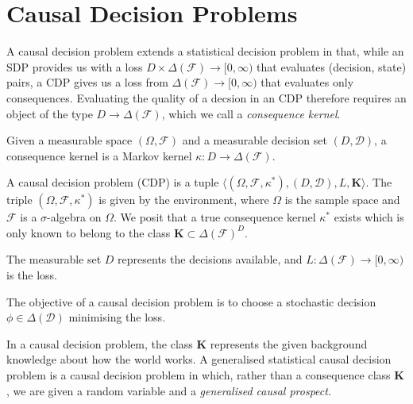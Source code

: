 \section{Causal Decision Problems}

A causal decision problem extends a statistical decision problem in that, while an SDP provides us with a loss $D\times \Delta(\mathcal{F})\to [0,\infty)$ that evaluates (decision, state) pairs, a CDP gives us a loss from $\Delta(\mathcal{F})\to [0,\infty)$ that evaluates only consequences. Evaluating the quality of a decsion in an CDP therefore requires an object of the type $D\to \Delta(\mathcal{F})$, which we call a \emph{consequence kernel}.

\begin{definition}
Given a measurable space $(\Omega,\mathcal{F})$ and a measurable decision set $(D,\mathcal{D})$, a consequence kernel is a Markov kernel $\kappa:D \to \Delta(\mathcal{F})$.
\end{definition}

\begin{definition}
A causal decision problem (CDP) is a tuple $\langle (\Omega,\mathcal{F},\kappa^*), (D,\mathcal{D}), L, \mathbf{K} \rangle$. The triple $(\Omega,\mathcal{F},\kappa^*)$ is given by the environment, where $\Omega$ is the sample space and $\mathcal{F}$ is a $\sigma$-algebra on $\Omega$. We posit that a true consequence kernel $\kappa^*$ exists which is only known to belong to the class $\mathbf{K}\subset \Delta(\mathcal{F})^D$.

The measurable set $D$ represents the decisions available, and $L:\Delta(\mathcal{F})\to [0,\infty)$ is the loss.

The objective of a causal decision problem is to choose a stochastic decision $\phi\in \Delta(\mathcal{D})$ minimising the loss.
\end{definition}

In a causal decision problem, the class $\mathbf{K}$ represents the given background knowledge about how the world works. A generalised statistical causal decision problem is a causal decision problem in which, rather than a consequence class $\mathbf{K}$, we are given a random variable and a \emph{generalised causal prospect}.


